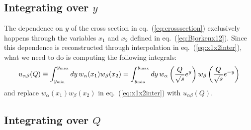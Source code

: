 \documentclass[10pt,a4paper]{article}
\begin{document}
\subsection{Integrating over $y$}

The dependence on $y$ of the cross section in
eq.~(\ref{eq:crosssection}) exclusively happens through the variables
$x_1$ and $x_2$ defined in eq.~(\ref{eq:Bjorkenx12}). Since this
dependence is reconstructed through interpolation in
eq.~(\ref{eq:x1x2inter}), what we need to do is computing the
following integrals:
\begin{equation}
u_{\alpha\beta}(Q)\equiv\int_{y_{\rm min}}^{y_{\rm max}}dy\,
w_\alpha(x_1)w_\beta(x_2) = \int_{y_{\rm min}}^{y_{\rm max}}dy\,w_\alpha\left(\frac{Q}{\sqrt{s}}e^y\right)w_\beta\left(\frac{Q}{\sqrt{s}}e^{-y}\right)
\end{equation}
and replace $w_\alpha(x_1)w_\beta(x_2)$ in eq.~(\ref{eq:x1x2inter})
with $u_{\alpha\beta}(Q)$.

\subsection{Integrating over $Q$}
\end{document}
